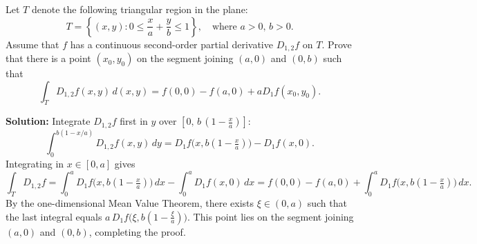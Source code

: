 \begin{problembox}
Let \( T \) denote the following triangular region in the plane:
\[T = \left\{ (x, y) : 0 \leq \frac{x}{a} + \frac{y}{b} \leq 1 \right\}, \quad \text{where } a > 0, \, b > 0.\]
Assume that \( f \) has a continuous second-order partial derivative \( D_{1,2} f \) on \( T \). Prove that there is a point \( (x_0, y_0) \) on the segment joining \( (a, 0) \) and \( (0, b) \) such that
\[\int_T D_{1,2} f(x, y) \, d(x, y) = f(0, 0) - f(a, 0) + aD_1 f(x_0, y_0).\]
\end{problembox}

\noindent\textbf{Solution:}
Integrate $D_{1,2}f$ first in $y$ over $[0,\,b\,(1-\tfrac{x}{a})]$:
\[ \int_0^{b(1-x/a)} D_{1,2}f(x,y)\,dy = D_1 f\big(x, b(1-\tfrac{x}{a})\big) - D_1 f(x,0). \]
Integrating in $x\in[0,a]$ gives
\[ \int_T D_{1,2}f = \int_0^a D_1 f\big(x, b(1-\tfrac{x}{a})\big)\,dx - \int_0^a D_1 f(x,0)\,dx = f(0,0)-f(a,0) + \int_0^a D_1 f\big(x, b(1-\tfrac{x}{a})\big)\,dx. \]
By the one-dimensional Mean Value Theorem, there exists $\xi\in(0,a)$ such that the last integral equals $a\,D_1 f\big(\xi, b(1-\tfrac{\xi}{a})\big)$. This point lies on the segment joining $(a,0)$ and $(0,b)$, completing the proof.